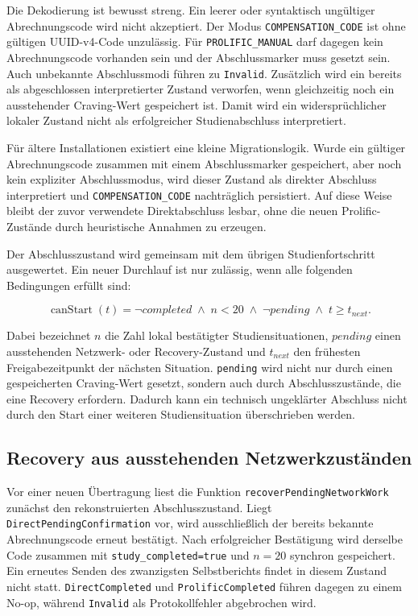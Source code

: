 \begin{neu}
Die Dekodierung ist bewusst streng. Ein leerer oder syntaktisch ungültiger Abrechnungscode wird nicht akzeptiert. Der Modus \texttt{COMPENSATION\_CODE} ist ohne gültigen UUID-v4-Code unzulässig. Für \texttt{PROLIFIC\_MANUAL} darf dagegen kein Abrechnungscode vorhanden sein und der Abschlussmarker muss gesetzt sein. Auch unbekannte Abschlussmodi führen zu \texttt{Invalid}. Zusätzlich wird ein bereits als abgeschlossen interpretierter Zustand verworfen, wenn gleichzeitig noch ein ausstehender Craving-Wert gespeichert ist. Damit wird ein widersprüchlicher lokaler Zustand nicht als erfolgreicher Studienabschluss interpretiert.

Für ältere Installationen existiert eine kleine Migrationslogik. Wurde ein gültiger Abrechnungscode zusammen mit einem Abschlussmarker gespeichert, aber noch kein expliziter Abschlussmodus, wird dieser Zustand als direkter Abschluss interpretiert und \texttt{COMPENSATION\_CODE} nachträglich persistiert. Auf diese Weise bleibt der zuvor verwendete Direktabschluss lesbar, ohne die neuen Prolific-Zustände durch heuristische Annahmen zu erzeugen.

Der Abschlusszustand wird gemeinsam mit dem übrigen Studienfortschritt ausgewertet. Ein neuer Durchlauf ist nur zulässig, wenn alle folgenden Bedingungen erfüllt sind:

\[
\operatorname{canStart}(t) = \neg completed \;\land\; n < 20 \;\land\; \neg pending \;\land\; t \geq t_{next}.
\]

Dabei bezeichnet \(n\) die Zahl lokal bestätigter Studiensituationen, \(pending\) einen ausstehenden Netzwerk- oder Recovery-Zustand und \(t_{next}\) den frühesten Freigabezeitpunkt der nächsten Situation. \texttt{pending} wird nicht nur durch einen gespeicherten Craving-Wert gesetzt, sondern auch durch Abschlusszustände, die eine Recovery erfordern. Dadurch kann ein technisch ungeklärter Abschluss nicht durch den Start einer weiteren Studiensituation überschrieben werden.

\subsection{Recovery aus ausstehenden Netzwerkzuständen}

Vor einer neuen Übertragung liest die Funktion \texttt{recoverPendingNetworkWork} zunächst den rekonstruierten Abschlusszustand. Liegt \texttt{DirectPendingConfirmation} vor, wird ausschließlich der bereits bekannte Abrechnungscode erneut bestätigt. Nach erfolgreicher Bestätigung wird derselbe Code zusammen mit \texttt{study\_completed=true} und \(n=20\) synchron gespeichert. Ein erneutes Senden des zwanzigsten Selbstberichts findet in diesem Zustand nicht statt. \texttt{DirectCompleted} und \texttt{ProlificCompleted} führen dagegen zu einem No-op, während \texttt{Invalid} als Protokollfehler abgebrochen wird.


\end{neu}
